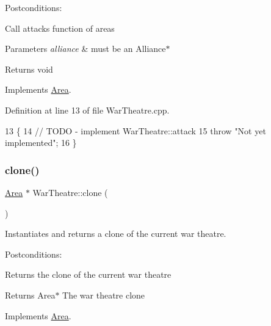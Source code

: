 Postconditions\+:
\begin{DoxyItemize}
\item Call attacks function of areas
\end{DoxyItemize}


\begin{DoxyParams}{Parameters}
{\em alliance} & must be an Alliance$\ast$ \\
\hline
\end{DoxyParams}
\begin{DoxyReturn}{Returns}
void 
\end{DoxyReturn}


Implements \hyperlink{classArea}{Area}.



Definition at line 13 of file War\+Theatre.\+cpp.


\begin{DoxyCode}
13                                           \{
14     \textcolor{comment}{// TODO - implement WarTheatre::attack}
15     \textcolor{keywordflow}{throw} \textcolor{stringliteral}{"Not yet implemented"};
16 \}
\end{DoxyCode}
\mbox{\label{classWarTheatre_a501f851edf6f5ad00770414e50505175}} 
\subsubsection{\texorpdfstring{clone()}{clone()}}
{\footnotesize\ttfamily \hyperlink{classArea}{Area} $\ast$ War\+Theatre\+::clone (\begin{DoxyParamCaption}{ }\end{DoxyParamCaption})\hspace{0.3cm}{\ttfamily [virtual]}}



Instantiates and returns a clone of the current war theatre. 

Postconditions\+:
\begin{DoxyItemize}
\item Returns the clone of the current war theatre
\end{DoxyItemize}

\begin{DoxyReturn}{Returns}
Area$\ast$ The war theatre clone 
\end{DoxyReturn}


Implements \hyperlink{classArea}{Area}.



